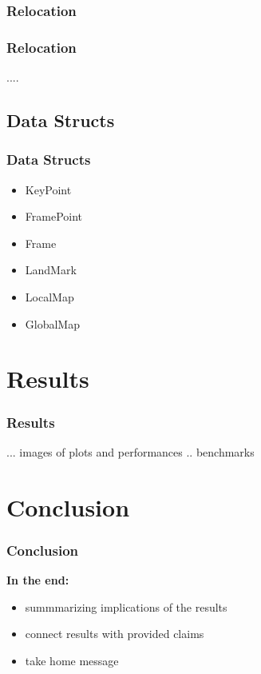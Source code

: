\documentclass[16pt]{beamer}
\begin{document}
\subsubsection*{Relocation}
\begin{frame}
  \frametitle{Relocation}
  ....
\end{frame}


\subsection{Data Structs}
\begin{frame}
  \frametitle{Data Structs }
  \begin{itemize}
  \item KeyPoint
  \item FramePoint
  \item Frame
  \item LandMark
  \item LocalMap
  \item GlobalMap
  \end{itemize}
\end{frame}


\section{ Results }
\begin{frame}
  \frametitle{Results}
  ...
  images of plots and performances .. benchmarks
\end{frame}

\section{ Conclusion}
\begin{frame}
  \frametitle{Conclusion}
  \textbf{ In the end: } \\
  \begin{itemize}
  \item summmarizing implications of the results
  \item connect results with provided claims
  \item take home message
  \end{itemize}
\end{frame}
\end{document}
